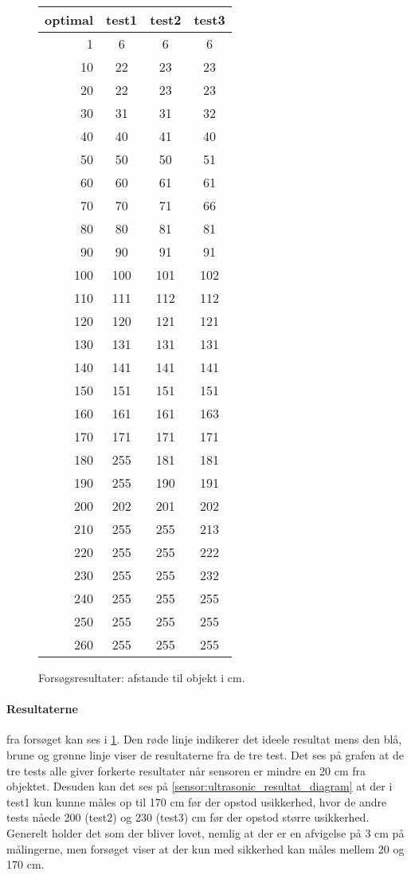\begin{figure}[h]
\centering
\begin{tabular}{r | c | c | c |}
optimal & test1 & test2 & test3 \\
\hline
1 & 6 & 6 & 6 \\
10&	22&	23&	23\\
20&	22&	23&	23\\
30&	31&	31&	32\\
40&	40&	41&	40\\
50&	50&	50&	51\\
60&	60&	61&	61\\
70&	70&	71&	66\\
80&	80&	81&	81\\
90&	90&	91&	91\\
100&	100&	101&	102\\
110&	111&	112&	112\\
120&	120&	121&	121\\
130&	131&	131&	131\\
140&	141&	141&	141\\
150&	151&	151&	151\\
160&	161&	161&	163\\
170&	171&	171&	171\\
180&	255&	181&	181\\
190&	255&	190&	191\\
200&	202&	201&	202\\
210&	255&	255&	213\\
220&	255&	255&	222\\
230&	255&	255&	232\\
240&	255&	255&	255\\
250&	255&	255&	255\\
260&	255&	255&	255\\
\end{tabular}
\caption{Forsøgsresultater: afstande til objekt i cm.}
\label{sensor:ultrasonic_test_data}
\end{figure}

\paragraph{Resultaterne} fra forsøget kan ses i \cref{sensor:ultrasonic_test_data}.
Den røde linje indikerer det ideele resultat mens den blå, brune og grønne linje viser de resultaterne fra de tre test.
Det ses på grafen at de tre tests alle giver forkerte resultater når sensoren er mindre en 20 cm fra objektet.
Desuden kan det ses på \cref{sensor:ultrasonic_resultat_diagram} at der i test1 kun kunne måles op til 170 cm før der opstod usikkerhed, hvor de andre tests nåede 200 (test2) og 230 (test3) cm før der opstod større usikkerhed.
Generelt holder det som der bliver lovet, nemlig at der er en afvigelse på 3 cm på målingerne, men forsøget viser at der kun med sikkerhed kan måles mellem 20 og 170 cm.

